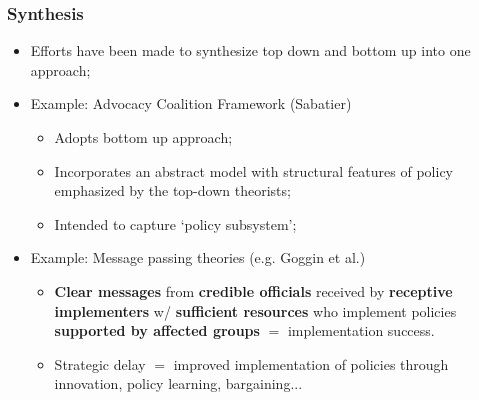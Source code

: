 \documentclass[aspectratio=169]{beamer}
\theoremstyle{principle}
\begin{document}
\begin{frame}
\frametitle{Synthesis}

\begin{itemize}
\item Efforts have been made to synthesize top down and bottom up into one approach;
\bigskip
\bigskip
\item Example: Advocacy Coalition Framework (Sabatier)
\begin{itemize}
\item Adopts bottom up approach;
\item Incorporates an abstract model with structural features of policy emphasized by the top-down theorists;
\item Intended to capture `policy subsystem';
\end{itemize}
\bigskip
\bigskip
\item Example: Message passing theories (e.g. Goggin et al.)
\begin{itemize}
\item \textbf{Clear messages} from \textbf{credible officials} received by \textbf{receptive implementers} w/ \textbf{sufficient resources} who implement policies \textbf{supported by affected groups} $=$ implementation success.
\item Strategic delay $=$ improved implementation of policies through innovation, policy learning, bargaining...
\end{itemize}
\end{itemize}

\end{frame}

\end{document}
